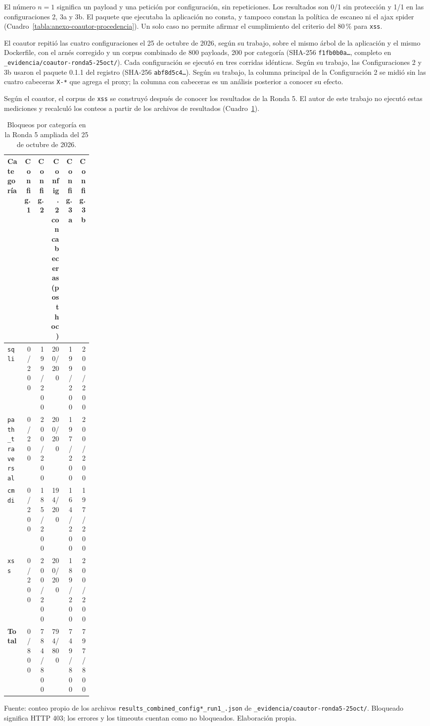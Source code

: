 El número $n = 1$ significa un payload y una petición por configuración, sin repeticiones. Los resultados son 0/1 sin protección y 1/1 en las configuraciones 2, 3a y 3b. El paquete que ejecutaba la aplicación no consta, y tampoco constan la política de escaneo ni el ajax spider (Cuadro~\ref{tabla:anexo-coautor-procedencia}). Un solo caso no permite afirmar el cumplimiento del criterio del 80\,\% para \texttt{xss}.

El coautor repitió las cuatro configuraciones el 25 de octubre de 2026, según su trabajo, sobre el mismo árbol de la aplicación y el mismo Dockerfile, con el arnés corregido y un corpus combinado de 800 payloads, 200 por categoría (SHA-256 \texttt{f1fb0b0a\ldots}, completo en \texttt{\_evidencia/coautor-ronda5-25oct/}). Cada configuración se ejecutó en tres corridas idénticas. Según su trabajo, las Configuraciones 2 y 3b usaron el paquete 0.1.1 del registro (SHA-256 \texttt{abf8d5c4\ldots}). Según su trabajo, la columna principal de la Configuración 2 se midió sin las cuatro cabeceras \texttt{X-*} que agrega el proxy; la columna con cabeceras es un análisis posterior a conocer su efecto.

Según el coautor, el corpus de \texttt{xss} se construyó después de conocer los resultados de la Ronda 5. El autor de este trabajo no ejecutó estas mediciones y recalculó los conteos a partir de los archivos de resultados (Cuadro~\ref{tabla:anexo-coautor-25oct}).

\begin{table}[htbp]
\centering
\footnotesize
\setlength{\tabcolsep}{3pt}
\begin{tabular}{|p{0.20\linewidth}|r|r|r|r|r|}
\hline
\textbf{Categoría} & \textbf{Config. 1} & \textbf{Config. 2} & \textbf{Config. 2 con cabeceras (post hoc)} & \textbf{Config. 3a} & \textbf{Config. 3b} \\ \hline
\texttt{sqli} & 0/200 & 199/200 & 200/200 & 199/200 & 200/200 \\ \hline
\texttt{path\_traversal} & 0/200 & 200/200 & 200/200 & 197/200 & 200/200 \\ \hline
\texttt{cmdi} & 0/200 & 185/200 & 194/200 & 164/200 & 197/200 \\ \hline
\texttt{xss} & 0/200 & 200/200 & 200/200 & 189/200 & 200/200 \\ \hline
\textbf{Total} & 0/800 & 784/800 & 794/800 & 749/800 & 797/800 \\ \hline
\end{tabular}
\caption{Bloqueos por categoría en la Ronda 5 ampliada del 25 de octubre de 2026.}
\label{tabla:anexo-coautor-25oct}
\par\smallskip\footnotesize Fuente: conteo propio de los archivos \texttt{results\_\allowbreak combined\_\allowbreak config*\_\allowbreak run1\_.\allowbreak json} de \texttt{\_evidencia/coautor-ronda5-25oct/}. Bloqueado significa HTTP 403; los errores y los timeouts cuentan como no bloqueados. Elaboración propia.
\end{table}

